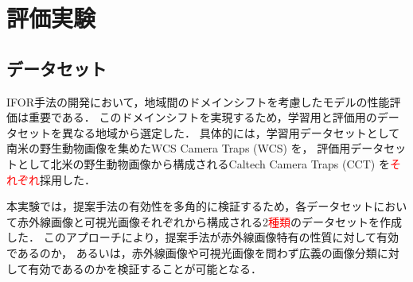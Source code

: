 \documentclass[a4paper,11pt,nomag]{jsreport}
\begin{document}
\setcounter{chapter}{4}

\chapter*{評価実験}

\section{データセット}

IFOR手法の開発において，地域間のドメインシフトを考慮したモデルの性能評価は重要である．
このドメインシフトを実現するため，学習用と評価用のデータセットを異なる地域から選定した．
具体的には，学習用データセットとして南米の野生動物画像を集めたWCS Camera Traps (WCS) \cite{wcs}を，
評価用データセットとして北米の野生動物画像から構成されるCaltech Camera Traps (CCT) \cite{cct}を\textcolor{red}{それぞれ}採用した．

本実験では，提案手法の有効性を多角的に検証するため，各データセットにおいて赤外線画像と可視光画像それぞれから構成される2\textcolor{red}{種類}のデータセットを作成した．
このアプローチにより，提案手法が赤外線画像特有の性質に対して有効であるのか，
あるいは，赤外線画像や可視光画像を問わず広義の画像分類に対して有効であるのかを検証することが可能となる．
\end{document}
